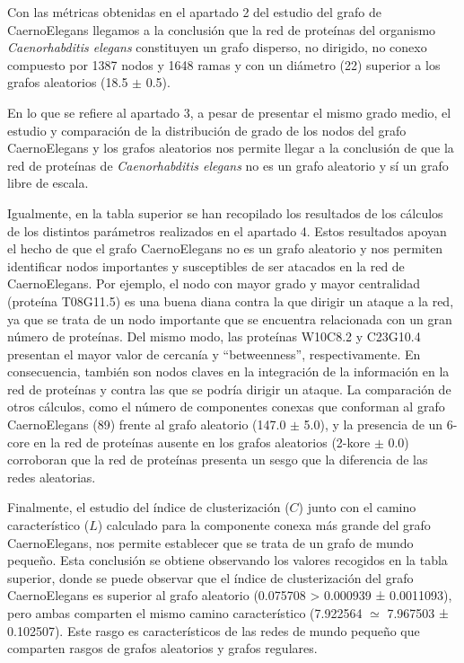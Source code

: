 \documentclass[11pt]{article}
\begin{document}
    Con las métricas obtenidas en el apartado 2 del estudio del grafo de
CaernoElegans llegamos a la conclusión que la red de proteínas del
organismo \emph{Caenorhabditis elegans} constituyen un grafo disperso,
no dirigido, no conexo compuesto por 1387 nodos y 1648 ramas y con un
diámetro (22) superior a los grafos aleatorios (18.5 \(\pm\) 0.5).

En lo que se refiere al apartado 3, a pesar de presentar el mismo grado
medio, el estudio y comparación de la distribución de grado de los nodos
del grafo CaernoElegans y los grafos aleatorios nos permite llegar a la
conclusión de que la red de proteínas de \emph{Caenorhabditis elegans}
no es un grafo aleatorio y sí un grafo libre de escala.

Igualmente, en la tabla superior se han recopilado los resultados de los
cálculos de los distintos parámetros realizados en el apartado 4. Estos
resultados apoyan el hecho de que el grafo CaernoElegans no es un grafo
aleatorio y nos permiten identificar nodos importantes y susceptibles de
ser atacados en la red de CaernoElegans. Por ejemplo, el nodo con mayor
grado y mayor centralidad (proteína T08G11.5) es una buena diana contra
la que dirigir un ataque a la red, ya que se trata de un nodo importante
que se encuentra relacionada con un gran número de proteínas. Del mismo
modo, las proteínas W10C8.2 y C23G10.4 presentan el mayor valor de
cercanía y ``betweenness'', respectivamente. En consecuencia, también
son nodos claves en la integración de la información en la red de
proteínas y contra las que se podría dirigir un ataque. La comparación
de otros cálculos, como el número de componentes conexas que conforman
al grafo CaernoElegans (89) frente al grafo aleatorio (147.0 \(\pm\)
5.0), y la presencia de un 6-core en la red de proteínas ausente en los
grafos aleatorios (2-kore \(\pm\) 0.0) corroboran que la red de
proteínas presenta un sesgo que la diferencia de las redes aleatorias.

Finalmente, el estudio del índice de clusterización (\(C\)) junto con el
camino característico (\(L\)) calculado para la componente conexa más
grande del grafo CaernoElegans, nos permite establecer que se trata de
un grafo de mundo pequeño. Esta conclusión se obtiene observando los
valores recogidos en la tabla superior, donde se puede observar que el
índice de clusterización del grafo CaernoElegans es superior al grafo
aleatorio (0.075708 \textgreater{} 0.000939 ± 0.0011093), pero ambas
comparten el mismo camino característico (7.922564 \(\simeq\) 7.967503 ±
0.102507). Este rasgo es característicos de las redes de mundo pequeño
que comparten rasgos de grafos aleatorios y grafos regulares.


    
    
    
    
\end{document}
